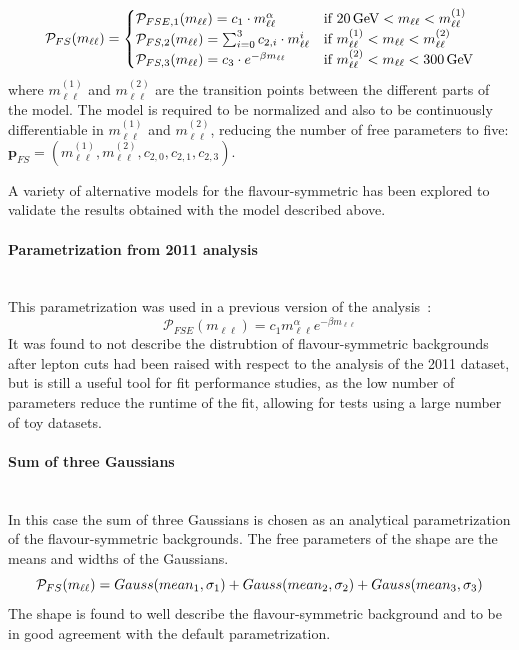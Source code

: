 \begin{eqnarray*}
{\mathcal{P}}_{FS}(m_{\ell\ell}) = \begin{cases} {\mathcal{P}}_{FSE,1}(m_{\ell\ell}) = c_{1} \cdot m_{\ell\ell}^{\alpha} &\mbox{if } 20\,\text{Ge\hspace{-.08em}V} < m_{\ell\ell} < m_{\ell\ell}^{(1)} \\
{\mathcal{P}}_{FS,2}(m_{\ell\ell}) = \sum_{i=0}^{3} c_{2,i} \cdot m_{\ell\ell}^{i} & \mbox{if } m_{\ell\ell}^{(1)}<m_{\ell\ell}<m_{\ell\ell}^{(2)} \\
{\mathcal{P}}_{FS,3}(m_{\ell\ell}) = c_{3}\cdot e^{-\beta m_{\ell\ell}} & \mbox{if } m_{\ell\ell}^{(2)}<m_{\ell\ell}<300\,\text{Ge\hspace{-.08em}V} \\
\end{cases} 
\end{eqnarray*}
where $m_{\ell\ell}^{(1)}$ and $m_{\ell\ell}^{(2)}$ are the transition points between the different parts of the model. The model is required to be normalized and also to be continuously differentiable in $m_{\ell\ell}^{(1)}$ and $m_{\ell\ell}^{(2)}$, reducing the number of free parameters to five: $\mathbf{p}_{FS} = (m_{\ell\ell}^{(1)},m_{\ell\ell}^{(2)},c_{2,0},c_{2,1},c_{2,3})$. 

A variety of alternative models for the flavour-symmetric has been explored to validate the results obtained with the model described above. 

\paragraph{Parametrization from 2011 analysis}\mbox{} \\
This parametrization was used in a previous version of the analysis~\cite{edge2011}: 
\begin{equation*}
 \mathcal{P}_{FSE}(m_{\ell\ell}) = c_{1} m_{\ell\ell}^{\alpha} e^{-\beta m_{\ell\ell}}
\end{equation*}
It was found to not describe the distrubtion of flavour-symmetric backgrounds after lepton \pt cuts had been raised with respect to the analysis of the 2011 dataset, but is still a useful tool for fit performance studies, as the low number of parameters reduce the runtime of the fit, allowing for tests using a large number of toy datasets.
\paragraph{Sum of three Gaussians}\mbox{} \\
In this case the sum of three Gaussians is chosen as an analytical parametrization of the flavour-symmetric backgrounds. The free parameters of the shape are the means and widths of the Gaussians.
\begin{equation*}
\mathcal{P}_{FS}(m_{\ell\ell}) = Gauss(mean_1,\sigma_1) + Gauss(mean_2,\sigma_2) + Gauss(mean_3,\sigma_3)\\
\end{equation*}
The shape is found to well describe the flavour-symmetric background and to be in good agreement with the default parametrization.

